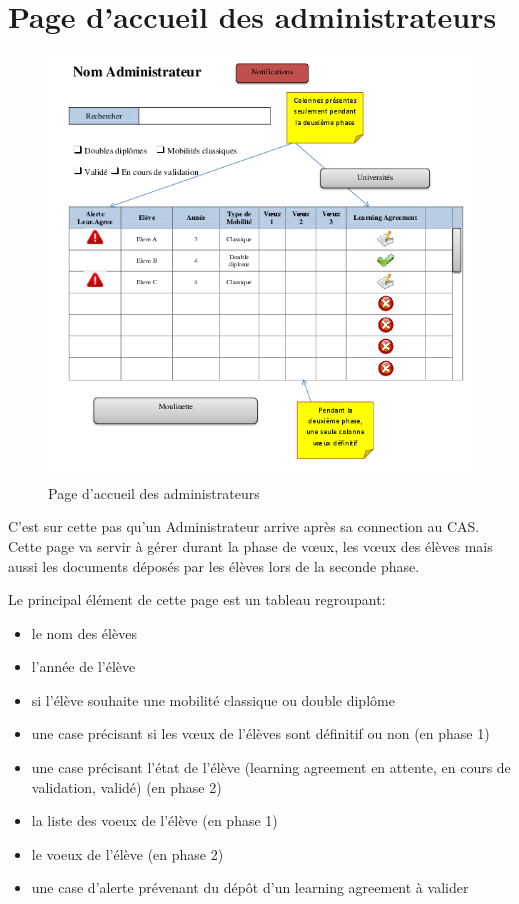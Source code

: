 \section{Page d'accueil des administrateurs}
\label{sec::home_admin}

\begin{figure}[H]
	\includegraphics[scale=0.7]{Admin/HomeAd.png}
	\caption{Page d'accueil des administrateurs}
\end{figure}

C'est sur cette pas qu'un Administrateur arrive après sa connection au CAS. Cette page va servir à gérer durant la phase de vœux, les vœux des élèves mais aussi les documents déposés par les élèves lors de la seconde phase.

Le principal élément de cette page est un tableau regroupant:
\begin{itemize}
 	\item le nom des élèves
 	\item l'année de l'élève
 	\item si l'élève souhaite une mobilité classique ou double diplôme
 	\item une case précisant si les vœux de l'élèves sont définitif ou non (en phase 1)
 	\item une case précisant l'état de l'élève (learning agreement en attente, en cours de validation, validé) (en phase 2)
 	\item la liste des voeux de l'élève (en phase 1)
 	\item le voeux de l'élève (en phase 2)
 	\item une case d'alerte prévenant du dépôt d'un learning agreement à valider
 \end{itemize}
 
